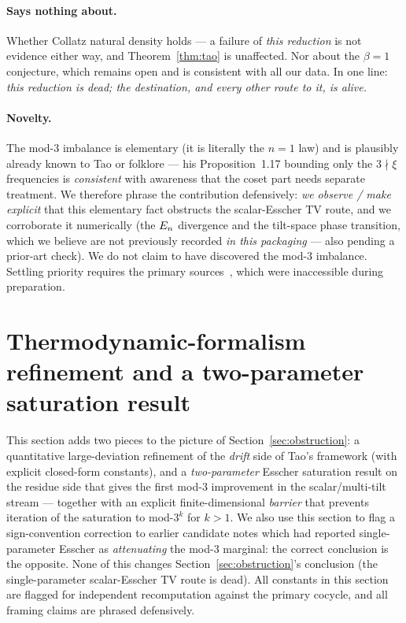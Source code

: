 \documentclass[11pt]{amsart}
\theoremstyle{definition}
\theoremstyle{remark}
\begin{document}
\paragraph{Says nothing about.}
Whether Collatz natural density holds --- a failure of \emph{this reduction} is not evidence either way,
and Theorem~\ref{thm:tao} is unaffected. Nor about the $\beta=1$ conjecture, which remains open and is
consistent with all our data. In one line: \emph{this reduction is dead; the destination, and every other
route to it, is alive.}

\paragraph{Novelty.}
The mod-$3$ imbalance is elementary (it is literally the $n=1$ law) and is plausibly already known to Tao
or folklore --- his Proposition~1.17 bounding only the $3\nmid\xi$ frequencies is \emph{consistent} with
awareness that the coset part needs separate treatment. We therefore phrase the contribution defensively:
\emph{we observe / make explicit} that this elementary fact obstructs the scalar-Esscher TV route, and we
corroborate it numerically (the $E_n$ divergence and the tilt-space phase transition, which we
believe are not previously recorded \emph{in this packaging} --- also
pending a prior-art check). We do not claim to have discovered the mod-$3$ imbalance. Settling priority
requires the primary sources~\citep{tao2022,tao2020blog}, which were inaccessible during preparation.

\section{Thermodynamic-formalism refinement and a two-parameter saturation result}
\label{sec:thermo}

This section adds two pieces to the picture of Section~\ref{sec:obstruction}: a quantitative
large-deviation refinement of the \emph{drift} side of Tao's framework (with explicit closed-form
constants), and a \emph{two-parameter} Esscher saturation result on the residue side that gives the
first mod-$3$ improvement in the scalar/multi-tilt stream --- together with an explicit finite-dimensional
\emph{barrier} that prevents iteration of the saturation to mod-$3^k$ for $k>1$. We also use this section
to flag a sign-convention correction to earlier candidate notes which had reported single-parameter Esscher
as \emph{attenuating} the mod-$3$ marginal: the correct conclusion is the opposite. None of this changes
Section~\ref{sec:obstruction}'s conclusion (the single-parameter scalar-Esscher TV route is dead). All
constants in this section are
flagged for independent recomputation against the primary cocycle, and all framing claims are
phrased defensively.
\end{document}
